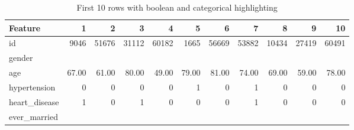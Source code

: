 \begin{table}[H]
    \centering
    \small


    \caption{First 10 rows with boolean and categorical highlighting}
    \label{tab:first_10_rows_colored}
    \begin{tabular}{@{} l r r r r r r r r r r @{}}
        \toprule
        \textbf{Feature} & \textbf{1} & \textbf{2} & \textbf{3} & \textbf{4} & \textbf{5} & \textbf{6} & \textbf{7} & \textbf{8} & \textbf{9} & \textbf{10} \\
        \midrule
        id & 9046 & 51676 & 31112 & 60182 & 1665 & 56669 & 53882 & 10434 & 27419 & 60491 \\
        gender & \cellcolor{colMale}{Male} & \cellcolor{colFemale}{Female} & \cellcolor{colMale}{Male} & \cellcolor{colFemale}{Female} & \cellcolor{colFemale}{Female} & \cellcolor{colMale}{Male} & \cellcolor{colMale}{Male} & \cellcolor{colFemale}{Female} & \cellcolor{colFemale}{Female} & \cellcolor{colFemale}{Female} \\
        age & 67.00 & 61.00 & 80.00 & 49.00 & 79.00 & 81.00 & 74.00 & 69.00 & 59.00 & 78.00 \\
        hypertension & \cellcolor{boolFalse}0 & \cellcolor{boolFalse}0 & \cellcolor{boolFalse}0 & \cellcolor{boolFalse}0 & \cellcolor{boolTrue}1 & \cellcolor{boolFalse}0 & \cellcolor{boolTrue}1 & \cellcolor{boolFalse}0 & \cellcolor{boolFalse}0 & \cellcolor{boolFalse}0 \\
        heart_disease & \cellcolor{boolTrue}1 & \cellcolor{boolFalse}0 & \cellcolor{boolTrue}1 & \cellcolor{boolFalse}0 & \cellcolor{boolFalse}0 & \cellcolor{boolFalse}0 & \cellcolor{boolTrue}1 & \cellcolor{boolFalse}0 & \cellcolor{boolFalse}0 & \cellcolor{boolFalse}0 \\
        ever_married & \cellcolor{colYes}{Yes} & \cellcolor{colYes}{Yes} & \cellcolor{colYes}{Yes} & \cellcolor{colYes}{Yes} & \cellcolor{colYes}{Yes} & \cellcolor{colYes}{Yes} & \cellcolor{colYes}{Yes} & \cellcolor{colNo}{No} & \cellcolor{colYes}{Yes} & \cellcolor{colYes}{Yes} \\

\end{tabular}
\end{table}
